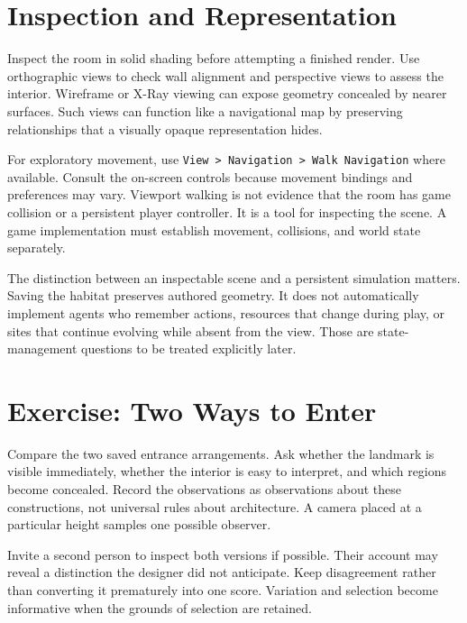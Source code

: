 \documentclass[11pt,openany]{book}
\begin{document}
\section{Inspection and Representation}

Inspect the room in solid shading before attempting a finished render. Use orthographic views to check wall alignment and perspective views to assess the interior. Wireframe or X-Ray viewing can expose geometry concealed by nearer surfaces. Such views can function like a navigational map by preserving relationships that a visually opaque representation hides.

For exploratory movement, use \texttt{View > Navigation > Walk Navigation} where available. Consult the on-screen controls because movement bindings and preferences may vary. Viewport walking is not evidence that the room has game collision or a persistent player controller. It is a tool for inspecting the scene. A game implementation must establish movement, collisions, and world state separately.

The distinction between an inspectable scene and a persistent simulation matters. Saving the habitat preserves authored geometry. It does not automatically implement agents who remember actions, resources that change during play, or sites that continue evolving while absent from the view. Those are state-management questions to be treated explicitly later.

\section{Exercise: Two Ways to Enter}

\begin{exercise}
Compare the two saved entrance arrangements. Ask whether the landmark is visible immediately, whether the interior is easy to interpret, and which regions become concealed. Record the observations as observations about these constructions, not universal rules about architecture. A camera placed at a particular height samples one possible observer.

Invite a second person to inspect both versions if possible. Their account may reveal a distinction the designer did not anticipate. Keep disagreement rather than converting it prematurely into one score. Variation and selection become informative when the grounds of selection are retained.
\end{exercise}

\end{document}
